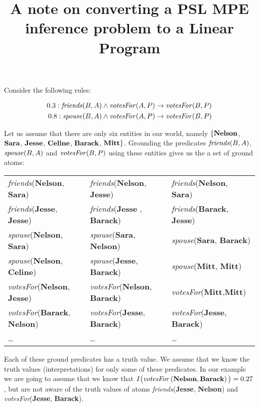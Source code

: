 \documentclass[12pt,a4paper]{article}
\title{A note on converting a PSL MPE inference problem to a Linear Program \vspace{-2ex} }
\date{}
\begin{document}
\maketitle

Consider the following rules:

\begin{align*}
0.3 : \text{\emph{friends}} (B,A) \land \text{\emph{votesFor}}(A,P) \to \text{\emph{votesFor}}(B,P) \\
0.8 : \text{\emph{spouse}} (B,A) \land \text{\emph{votesFor}}(A,P) \to \text{\emph{votesFor}}(B,P) 
\end{align*}

Let us assume that there are only six entities in our world, namely $\{\text{\textbf{Nelson}}$, $\text{\textbf{Sara}}$, $\text{\textbf{Jesse}}$, $\text{\textbf{Celine}}$, 
$\text{\textbf{Barack}}$, $\text{\textbf{Mitt}}\}$. Grounding the predicates $\text{\emph{friends}}(B,A)$, $\text{\emph{spouse}}(B,A)$ and $\text{\emph{votesFor}}(B,P)$ using these entities gives us the a set of ground atoms:

\begin{center}
\begin{tabular}{|lll|}
\hline
\emph{friends}(\textbf{Nelson}, \textbf{Sara}) & \emph{friends}(\textbf{Nelson}, \textbf{Jesse}) & \emph{friends}(\textbf{Nelson}, \textbf{Sara}) \\
\emph{friends}(\textbf{Jesse}, \textbf{Jesse}) & \emph{friends}(\textbf{Jesse} , \textbf{Barack}) & \emph{friends}(\textbf{Barack}, \textbf{Jesse}) \\
\emph{spouse}(\textbf{Nelson}, \textbf{Sara}) & \emph{spouse}(\textbf{Sara}, \textbf{Nelson}) & \emph{spouse}(\textbf{Sara}, \textbf{Barack}) \\
\emph{spouse}(\textbf{Nelson}, \textbf{Celine}) & \emph{spouse}(\textbf{Jesse}, \textbf{Barack}) & \emph{spouse}(\textbf{Mitt}, \textbf{Mitt})\\
\emph{votesFor}(\textbf{Nelson}, \textbf{Jesse}) & \emph{votesFor}(\textbf{Nelson}, \textbf{Barack}) & \emph{votesFor}(\textbf{Mitt},\textbf{Mitt}) \\
\emph{votesFor}(\textbf{Barack}, \textbf{Nelson}) & \emph{votesFor}(\textbf{Jesse}, \textbf{Barack}) & \emph{votesFor}(\textbf{Jesse}, \textbf{Barack})\\
\ldots & \ldots & \ldots\\
\hline
\end{tabular}
\end{center}

Each of these ground predicates has a truth value. We assume that we know the truth values (interpretations) for only some of these predicates. In our example we are going to assume that we know that $I\big(\text{\emph{votesFor}}\left(\text{\textbf{Nelson}},\text{\textbf{Barack}}\right)\big) = 0.27$, but are not aware of the truth values of atoms \emph{friends}(\textbf{Jesse}, \textbf{Nelson}) and \emph{votesFor}(\textbf{Jesse}, \textbf{Barack}). 
\end{document}
